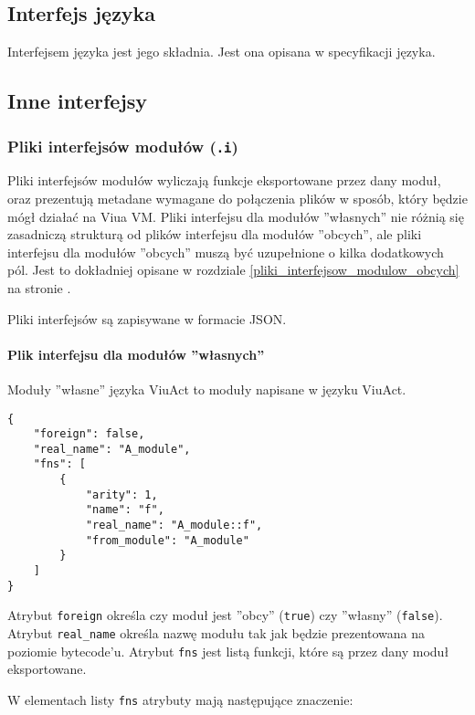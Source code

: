 \subsection{Interfejs języka}

Interfejsem języka jest jego składnia.
Jest ona opisana w specyfikacji języka.

\subsection{Inne interfejsy}

\subsubsection{Pliki interfejsów modułów (\texttt{.i})}
\label{pliki_interfejsow_modulow}

Pliki interfejsów modułów wyliczają funkcje eksportowane przez dany moduł, oraz prezentują metadane wymagane
do połączenia plików w sposób, który będzie mógł działać na Viua VM. Pliki interfejsu dla modułów ''własnych''
nie różnią się zasadniczą strukturą od plików interfejsu dla modułów ''obcych'', ale pliki interfejsu dla
modułów ''obcych'' muszą być uzupełnione o kilka dodatkowych pól. Jest to dokładniej opisane w rozdziale
\ref{pliki_interfejsow_modulow_obcych} na stronie \pageref{pliki_interfejsow_modulow_obcych}.

Pliki interfejsów są zapisywane w formacie JSON.

\paragraph{Plik interfejsu dla modułów ''własnych''}

Moduły ''własne'' języka ViuAct to moduły napisane w języku ViuAct.

\begin{lstlisting}
{
    "foreign": false,
    "real_name": "A_module",
    "fns": [
        {
            "arity": 1,
            "name": "f",
            "real_name": "A_module::f",
            "from_module": "A_module"
        }
    ]
}
\end{lstlisting}

Atrybut \texttt{foreign} określa czy moduł jest ''obcy'' (\texttt{true}) czy ''własny'' (\texttt{false}).
Atrybut \texttt{real\_name} określa nazwę modułu tak jak będzie prezentowana na poziomie bytecode'u.
Atrybut \texttt{fns} jest listą funkcji, które są przez dany moduł eksportowane.

W elementach listy \texttt{fns} atrybuty mają następujące znaczenie:


